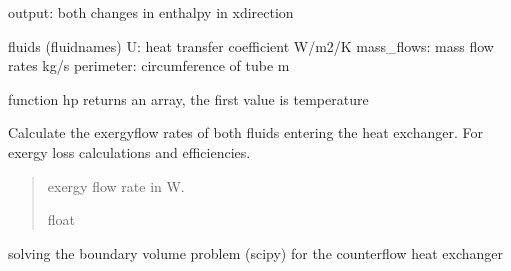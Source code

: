 \documentclass[letterpaper,10pt,english]{sphinxmanual}
\begin{document}
\begin{fulllineitems}
\begin{fulllineitems}
\sphinxAtStartPar
output: both changes in enthalpy in x\sphinxhyphen{}direction
\begin{description}
\sphinxAtStartPar
fluids (fluid\sphinxhyphen{}names)
U: heat transfer coefficient W/m2/K
mass\_flows: mass flow rates kg/s
perimeter: circumference of tube m

\end{description}

\sphinxAtStartPar
function hp returns an array, the first value is temperature

\end{fulllineitems}


\begin{fulllineitems}
\label{\detokenize{heat_exchanger:heat_exchanger.counterflow_hex.exergy_entering}}
\pysigstartsignatures
{}
\pysigstopsignatures
\sphinxAtStartPar
Calculate the exergyflow rates of both fluids entering
the heat exchanger. For exergy loss calculations and efficiencies.
\begin{quote}\begin{description}
\sphinxAtStartPar
{} \textendash{} exergy flow rate in W.

\sphinxAtStartPar
float

\end{description}\end{quote}

\end{fulllineitems}


\begin{fulllineitems}
\label{\detokenize{heat_exchanger:heat_exchanger.counterflow_hex.he_bvp_solve}}
\pysigstartsignatures
{}
\pysigstopsignatures
\sphinxAtStartPar
solving the boundary volume problem (scipy) for the counter\sphinxhyphen{}flow
heat exchanger
\begin{quote}\begin{description}
\sphinxAtStartPar


\end{description}
\end{quote}
\end{fulllineitems}
\end{fulllineitems}
\end{document}
